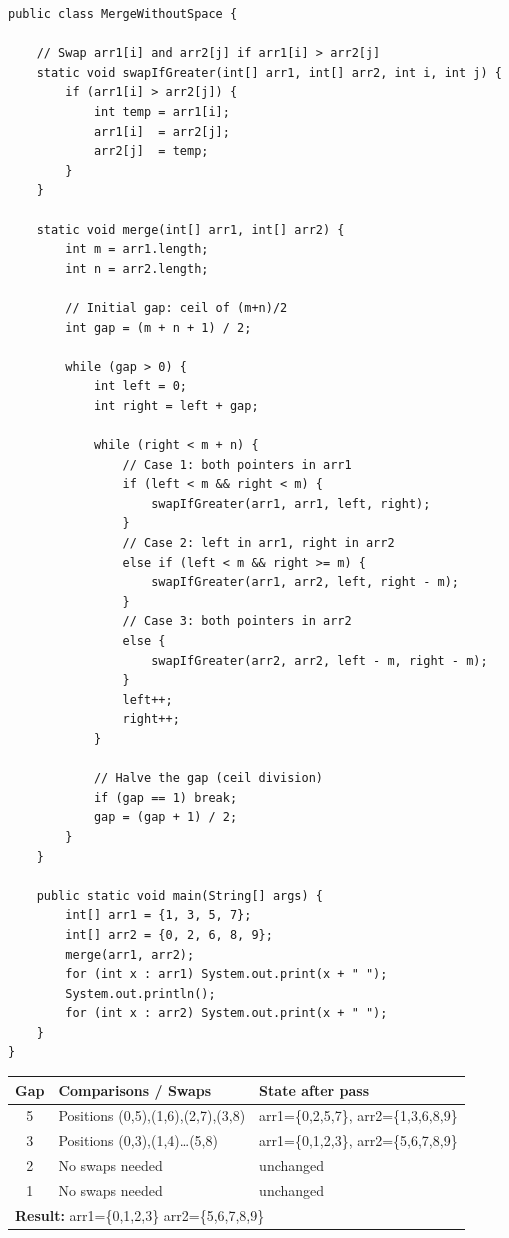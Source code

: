 \documentclass[12pt,a4paper,oneside]{book}
\begin{document}
\begin{lstlisting}[caption={Merge Without Extra Space --- Gap Method, O(n log n) time O(1) space}]
public class MergeWithoutSpace {

    // Swap arr1[i] and arr2[j] if arr1[i] > arr2[j]
    static void swapIfGreater(int[] arr1, int[] arr2, int i, int j) {
        if (arr1[i] > arr2[j]) {
            int temp = arr1[i];
            arr1[i]  = arr2[j];
            arr2[j]  = temp;
        }
    }

    static void merge(int[] arr1, int[] arr2) {
        int m = arr1.length;
        int n = arr2.length;

        // Initial gap: ceil of (m+n)/2
        int gap = (m + n + 1) / 2;

        while (gap > 0) {
            int left = 0;
            int right = left + gap;

            while (right < m + n) {
                // Case 1: both pointers in arr1
                if (left < m && right < m) {
                    swapIfGreater(arr1, arr1, left, right);
                }
                // Case 2: left in arr1, right in arr2
                else if (left < m && right >= m) {
                    swapIfGreater(arr1, arr2, left, right - m);
                }
                // Case 3: both pointers in arr2
                else {
                    swapIfGreater(arr2, arr2, left - m, right - m);
                }
                left++;
                right++;
            }

            // Halve the gap (ceil division)
            if (gap == 1) break;
            gap = (gap + 1) / 2;
        }
    }

    public static void main(String[] args) {
        int[] arr1 = {1, 3, 5, 7};
        int[] arr2 = {0, 2, 6, 8, 9};
        merge(arr1, arr2);
        for (int x : arr1) System.out.print(x + " ");
        System.out.println();
        for (int x : arr2) System.out.print(x + " ");
    }
}
\end{lstlisting}

\begin{dryrun}[arr1 = \{1,3,5,7\}, arr2 = \{0,2,6,8,9\}, combined size = 9]
\begin{center}
\begin{tabular}{cp{4.5cm}p{4cm}}
\toprule
\textbf{Gap} & \textbf{Comparisons / Swaps} & \textbf{State after pass}\\
\midrule
5 & Positions (0,5),(1,6),(2,7),(3,8) & arr1=\{0,2,5,7\}, arr2=\{1,3,6,8,9\}\\
3 & Positions (0,3),(1,4)\ldots(5,8) & arr1=\{0,1,2,3\}, arr2=\{5,6,7,8,9\}\\
2 & No swaps needed & unchanged\\
1 & No swaps needed & unchanged\\
\midrule
\multicolumn{3}{l}{\textbf{Result:} arr1=\{0,1,2,3\} \quad arr2=\{5,6,7,8,9\}}\\
\bottomrule
\end{tabular}
\end{center}
\end{dryrun}
\end{document}
